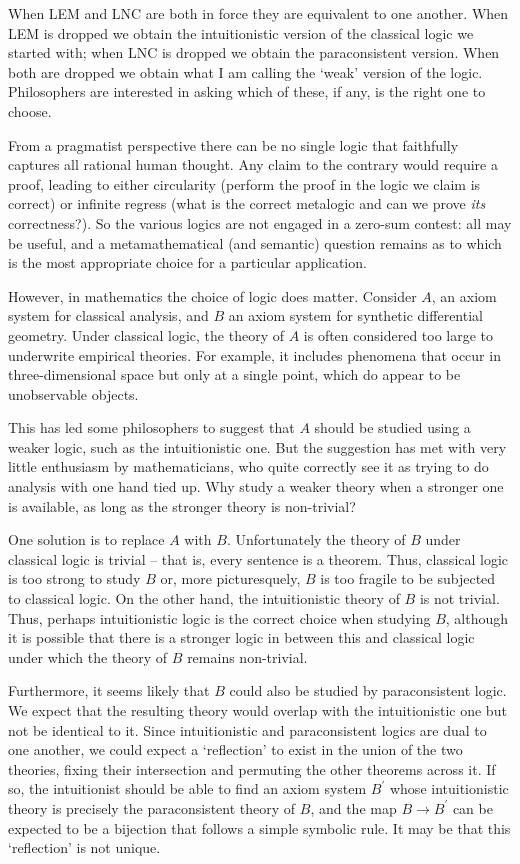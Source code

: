 \documentclass[oneside,english]{article}
\theoremstyle{plain}
\theoremstyle{definition}
\theoremstyle{definition}
\begin{document}
When LEM and LNC are both in force they are equivalent to one another. When LEM is dropped we obtain the intuitionistic version of the classical logic we started with; when LNC is dropped we obtain the paraconsistent version. When both are dropped we obtain what I am calling the `weak' version of the logic. Philosophers are interested in asking which of these, if any, is the right one to choose. 

From a pragmatist perspective there can be no single logic that faithfully captures all rational human thought. Any claim to the contrary would require a proof, leading to either circularity (perform the proof in the logic we claim is correct) or infinite regress (what is the correct metalogic and can we prove \emph{its} correctness?). So the various logics are not engaged in a zero-sum contest: all may be useful, and a metamathematical (and semantic) question remains as to which is the most appropriate choice for a particular application.

However, in mathematics the choice of logic does matter. Consider $A$, an axiom system for classical analysis, and $B$ an axiom system for synthetic differential geometry. Under classical logic, the theory of $A$ is often considered too large to underwrite empirical theories. For example, it includes phenomena that occur in three-dimensional space but only at a single point, which do appear to be unobservable objects. 

This has led some philosophers to suggest that $A$ should be studied using a weaker logic, such as the intuitionistic one. But the suggestion has met with very little enthusiasm by mathematicians, who quite correctly see it as trying to do analysis with one hand tied up. Why study a weaker theory when a stronger one is available, as long as the stronger theory is non-trivial?

One solution is to replace $A$ with $B$. Unfortunately the theory of $B$ under classical logic is trivial -- that is, every sentence is a theorem. Thus, classical logic is too strong to study $B$ or, more picturesquely, $B$ is too fragile to be subjected to classical logic. On the other hand, the intuitionistic theory of $B$ is not trivial. Thus, perhaps intuitionistic logic is the correct choice when studying $B$, although it is possible that there is a stronger logic in between this and classical logic under which the theory of $B$ remains non-trivial.

Furthermore, it seems likely that $B$ could also be studied by paraconsistent logic. We expect that the resulting theory would overlap with the intuitionistic one but not be identical to it. Since intuitionistic and paraconsistent logics are dual to one another, we could expect a `reflection' to exist in the union of the two theories, fixing their intersection and permuting the other theorems across it. If so, the intuitionist should be able to find an axiom system $B^\prime$ whose intuitionistic theory is precisely the paraconsistent theory of $B$, and the map $B\to B^\prime$ can be expected to be a bijection that follows a simple symbolic rule. It may be that this `reflection' is not unique.
\end{document}
